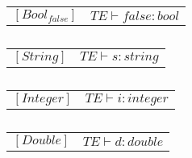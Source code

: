 \begin{table}[H]
    \centering
    \begin{longtable}[c] { r c }
        $[Bool_{false}]$ & 
        \( {TE \vdash false : bool} \) \\
    \end{longtable}
    \caption{}\label{s-empty}
\end{table}

\begin{table}[H]
    \centering
    \begin{longtable}[c] { r c }
        $[String]$ & 
        \( {TE \vdash s : string} \) \\
    \end{longtable}
    \caption{}\label{s-empty}
\end{table}

\begin{table}[H]
    \centering
    \begin{longtable}[c] { r c }
        $[Integer]$ & 
        \( {TE \vdash i : integer} \) \\
    \end{longtable}
    \caption{}\label{s-empty}
\end{table} 

\begin{table}[H]
    \centering
    \begin{longtable}[c] { r c }
        $[Double]$ & 
        \( {TE \vdash d : double} \) \\
    \end{longtable}
    \caption{}\label{s-empty}
\end{table} 


